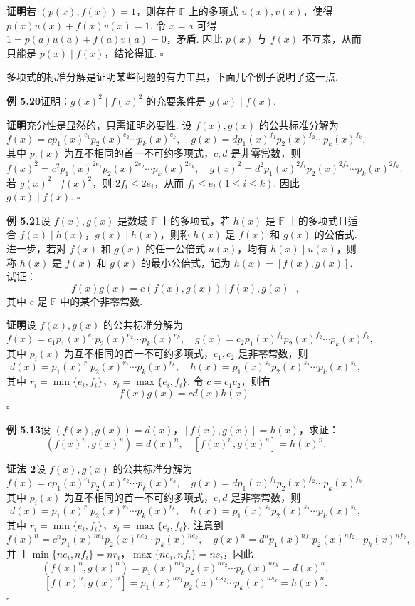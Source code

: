 \documentclass[UTF8, 12pt, fontset=fandol, oneside]{ctexart}
\begin{document}
\noindent\textbf{证明}\quad 若 $(p(x),f(x))=1$，则存在 $\mathbb{F}$ 上的多项式 $u(x),v(x)$，使得 $p(x)u(x)+f(x)v(x)=1$. 令 $x=a$ 可得 $1=p(a)u(a)+f(a)v(a)=0$，矛盾. 因此 $p(x)$ 与 $f(x)$ 不互素，从而只能是 $p(x)\mid f(x)$，结论得证. \hfill $\square$

多项式的标准分解是证明某些问题的有力工具，下面几个例子说明了这一点.

\noindent\textbf{例 5.20}\quad 证明：$g(x)^2\mid f(x)^2$ 的充要条件是 $g(x)\mid f(x)$.

\noindent\textbf{证明}\quad 充分性是显然的，只需证明必要性. 设 $f(x),g(x)$ 的公共标准分解为
\[
f(x)=cp_1(x)^{e_1}p_2(x)^{e_2}\cdots p_k(x)^{e_k},\quad
g(x)=dp_1(x)^{f_1}p_2(x)^{f_2}\cdots p_k(x)^{f_k},
\]
其中 $p_i(x)$ 为互不相同的首一不可约多项式，$c,d$ 是非零常数，则
\[
f(x)^2=c^2p_1(x)^{2e_1}p_2(x)^{2e_2}\cdots p_k(x)^{2e_k},\quad
g(x)^2=d^2p_1(x)^{2f_1}p_2(x)^{2f_2}\cdots p_k(x)^{2f_k}.
\]
若 $g(x)^2\mid f(x)^2$，则 $2f_i\le2e_i$，从而 $f_i\le e_i(1\le i\le k)$. 因此 $g(x)\mid f(x)$. \hfill $\square$

\noindent\textbf{例 5.21}\quad 设 $f(x),g(x)$ 是数域 $\mathbb{F}$ 上的多项式，若 $h(x)$ 是 $\mathbb{F}$ 上的多项式且适合 $f(x)\mid h(x)$，$g(x)\mid h(x)$，则称 $h(x)$ 是 $f(x)$ 和 $g(x)$ 的公倍式. 进一步，若对 $f(x)$ 和 $g(x)$ 的任一公倍式 $u(x)$，均有 $h(x)\mid u(x)$，则称 $h(x)$ 是 $f(x)$ 和 $g(x)$ 的最小公倍式，记为 $h(x)=[f(x),g(x)]$. 试证：
\[
f(x)g(x)=c(f(x),g(x))[f(x),g(x)],
\]
其中 $c$ 是 $\mathbb{F}$ 中的某个非零常数.

\noindent\textbf{证明}\quad 设 $f(x),g(x)$ 的公共标准分解为
\[
f(x)=c_1p_1(x)^{e_1}p_2(x)^{e_2}\cdots p_k(x)^{e_k},\quad
g(x)=c_2p_1(x)^{f_1}p_2(x)^{f_2}\cdots p_k(x)^{f_k},
\]
其中 $p_i(x)$ 为互不相同的首一不可约多项式，$c_1,c_2$ 是非零常数，则
\[
d(x)=p_1(x)^{r_1}p_2(x)^{r_2}\cdots p_k(x)^{r_k},\quad
h(x)=p_1(x)^{s_1}p_2(x)^{s_2}\cdots p_k(x)^{s_k},
\]
其中 $r_i=\min\{e_i,f_i\}$，$s_i=\max\{e_i,f_i\}$. 令 $c=c_1c_2$，则有
\[
f(x)g(x)=cd(x)h(x).
\]
\hfill $\square$

\noindent\textbf{例 5.13}\quad 设 $(f(x),g(x))=d(x)$，$[f(x),g(x)]=h(x)$，求证：
\[
(f(x)^n,g(x)^n)=d(x)^n,\quad [f(x)^n,g(x)^n]=h(x)^n.
\]

\noindent\textbf{证法 2}\quad 设 $f(x),g(x)$ 的公共标准分解为
\[
f(x)=cp_1(x)^{e_1}p_2(x)^{e_2}\cdots p_k(x)^{e_k},\quad
g(x)=dp_1(x)^{f_1}p_2(x)^{f_2}\cdots p_k(x)^{f_k},
\]
其中 $p_i(x)$ 为互不相同的首一不可约多项式，$c,d$ 是非零常数，则
\[
d(x)=p_1(x)^{r_1}p_2(x)^{r_2}\cdots p_k(x)^{r_k},\quad
h(x)=p_1(x)^{s_1}p_2(x)^{s_2}\cdots p_k(x)^{s_k},
\]
其中 $r_i=\min\{e_i,f_i\}$，$s_i=\max\{e_i,f_i\}$. 注意到
\[
f(x)^n=c^np_1(x)^{ne_1}p_2(x)^{ne_2}\cdots p_k(x)^{ne_k},\quad
g(x)^n=d^np_1(x)^{nf_1}p_2(x)^{nf_2}\cdots p_k(x)^{nf_k},
\]
并且 $\min\{ne_i,nf_i\}=nr_i$，$\max\{ne_i,nf_i\}=ns_i$，因此
\[
(f(x)^n,g(x)^n)=p_1(x)^{nr_1}p_2(x)^{nr_2}\cdots p_k(x)^{nr_k}=d(x)^n,
\]
\[
[f(x)^n,g(x)^n]=p_1(x)^{ns_1}p_2(x)^{ns_2}\cdots p_k(x)^{ns_k}=h(x)^n.
\]
\hfill $\square$
\end{document}
